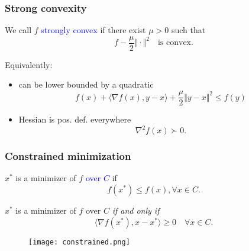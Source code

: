 \documentclass{beamer}
\begin{document}
\begin{frame}
  \frametitle{Strong convexity}
  \begin{definition}
    We call $f$ \textcolor{blue}{strongly convex} if there exist $\mu> 0$ such that
    \begin{equation}
      f - \frac{\mu}{2} \Vert \cdot \Vert^2 \quad \text{is convex.}
    \end{equation}
  \end{definition}

  Equivalently:
  \begin{itemize}
    \item can be lower bounded by a quadratic
          \begin{equation}
            f(x) + \langle \nabla f(x), y-x \rangle + \frac{\mu}{2} \Vert y-x \Vert^2 \le f(y)
          \end{equation}
    \item Hessian is pos. def. everywhere
          \begin{equation}
            \nabla^2 f(x) \succ 0.
          \end{equation}
  \end{itemize}

\end{frame}

\begin{frame}
  \frametitle{Constrained minimization}

  \begin{minipage}{0.5\textwidth}
    \begin{definition}
      $x^*$ is a minimizer of $f$ \textcolor{blue}{over $C$} if
      \begin{equation}
        f(x^*) \le f(x), \forall x \in C.
      \end{equation}
    \end{definition}
    \begin{lemma}%
      $x^*$ is a minimizer of $f$ over $C$ \emph{if and only if}
      \begin{equation}
        \langle \nabla f(x^*), x-x^* \rangle \ge 0 \quad \forall x \in C.
      \end{equation}
    \end{lemma}
  \end{minipage}
  \hfill
  \begin{minipage}{0.45\textwidth}
  \begin{figure}[ht]
    \centering
    \texttt{[image: constrained.png]}
  \end{figure}
  \end{minipage}
\end{frame}
\end{document}
